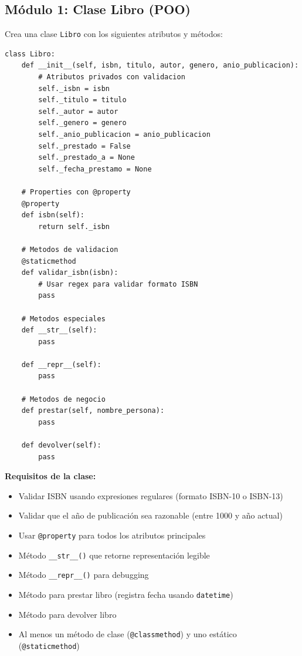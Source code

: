 \documentclass[12pt,a4paper]{article}
\begin{document}
\subsection{Módulo 1: Clase Libro (POO)}

Crea una clase \texttt{Libro} con los siguientes atributos y métodos:

\begin{lstlisting}[caption=Estructura básica de la clase Libro]
class Libro:
    def __init__(self, isbn, titulo, autor, genero, anio_publicacion):
        # Atributos privados con validacion
        self._isbn = isbn
        self._titulo = titulo
        self._autor = autor
        self._genero = genero
        self._anio_publicacion = anio_publicacion
        self._prestado = False
        self._prestado_a = None
        self._fecha_prestamo = None
    
    # Properties con @property
    @property
    def isbn(self):
        return self._isbn
    
    # Metodos de validacion
    @staticmethod
    def validar_isbn(isbn):
        # Usar regex para validar formato ISBN
        pass
    
    # Metodos especiales
    def __str__(self):
        pass
    
    def __repr__(self):
        pass
    
    # Metodos de negocio
    def prestar(self, nombre_persona):
        pass
    
    def devolver(self):
        pass
\end{lstlisting}

\textbf{Requisitos de la clase:}
\begin{itemize}[leftmargin=*]
    \item Validar ISBN usando expresiones regulares (formato ISBN-10 o ISBN-13)
    \item Validar que el año de publicación sea razonable (entre 1000 y año actual)
    \item Usar \texttt{@property} para todos los atributos principales
    \item Método \texttt{\_\_str\_\_()} que retorne representación legible
    \item Método \texttt{\_\_repr\_\_()} para debugging
    \item Método para prestar libro (registra fecha usando \texttt{datetime})
    \item Método para devolver libro
    \item Al menos un método de clase (\texttt{@classmethod}) y uno estático (\texttt{@staticmethod})
\end{itemize}
\end{document}
